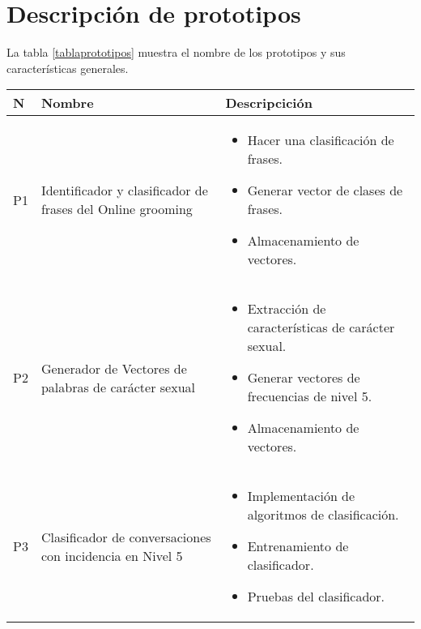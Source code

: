 \section{Descripci\'on de prototipos}

La tabla \ref{tablaprototipos} muestra el nombre de los prototipos y sus caracter\'isticas generales.



\begin{table}[h]

\begin{center}


\begin{tabular}{|l|p{45mm}|p{80mm}|}
\hline

N & Nombre & Descripcici\'on \\

\hline



P1 & Identificador y clasificador de frases del Online grooming & \begin{itemize}
\item Hacer una clasificaci\'on de frases.
\item Generar vector de clases de frases.
\item Almacenamiento de vectores.
\end{itemize} \\

\hline 

P2 & Generador de Vectores de palabras de car\'acter sexual & \begin{itemize}
\item Extracci\'on de caracter\'isticas de car\'acter sexual.
\item Generar vectores de frecuencias de nivel 5.
\item Almacenamiento de vectores. 

\end{itemize} \\

\hline 


P3 & Clasificador de conversaciones con incidencia en Nivel 5 & \begin{itemize}
\item Implementaci\'on de algoritmos de clasificaci\'on.
\item Entrenamiento de clasificador.
\item Pruebas del clasificador.
\end{itemize} \\


\end{tabular}
\end{center}
\end{table}
